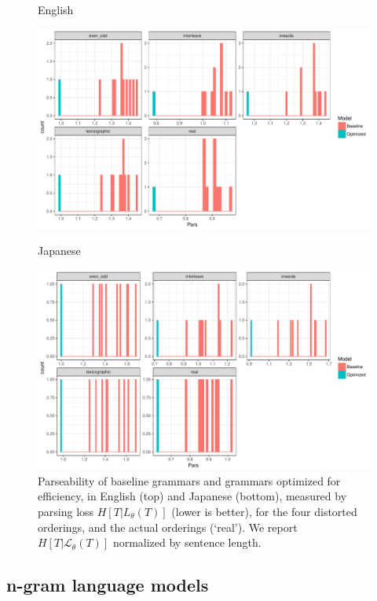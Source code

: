 \documentclass[10pt,twoside,lineno]{article}
\begin{document}
\begin{figure}
    \centering
    English
    
    \includegraphics[scale=.5]{../results/permuted/adversarial-parse-loss-english.pdf}
    
    Japanese
    
    \includegraphics[scale=.5]{../results/permuted/adversarial-parse-loss-japanese.pdf}
	\caption{Parseability of baseline grammars and grammars optimized for efficiency, in English (top) and Japanese (bottom), measured by parsing loss $H[T|L_\theta(T)]$ (lower is better), for the four distorted orderings, and the actual orderings (`real'). We report $H[T|\mathcal{L}_\theta(T)]$ normalized by sentence length.}
    \label{fig:distorted-parser}
\end{figure}


\subsection{n-gram language models}
\end{document}
